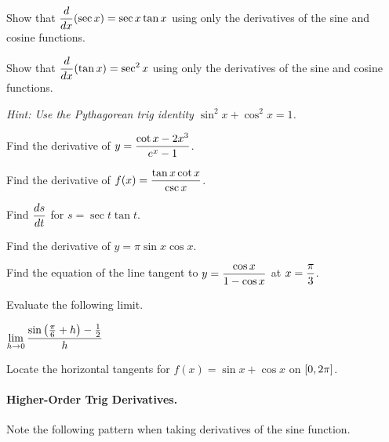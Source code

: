 \documentclass[12pt]{article}
\begin{document}
\vspace{3mm}

\Example Show that $\displaystyle\frac{d}{dx}(\sec x)=\sec x \tan x$ using only the derivatives of the sine and cosine functions.

\vspace{50mm}

\Example Show that $\displaystyle\frac{d}{dx}(\tan x)=\sec^2 x$ using only the derivatives of the sine and cosine functions.

\vspace{2mm}

\textit{Hint: Use the Pythagorean trig identity $\sin^2 x+\cos^2 x=1$.}

\newpage

\Example Find the derivative of $y=\displaystyle\frac{\cot x-2x^3}{e^x-1}$.

\vspace{30mm}

\Example Find the derivative of $f(x)=\displaystyle\frac{\tan x \cot x}{\csc x}$.

\vspace{30mm}

\Example Find $\displaystyle\frac{ds}{dt}$ for $s=\sec t \tan t$.

\vspace{50mm}

\Example Find the derivative of $y=\pi \sin x \cos x$. 

\newpage

\Example Find the equation of the line tangent to $y=\displaystyle\frac{\cos x}{1-\cos x}$ at $x=\displaystyle\frac{\pi}{3}$.

\vspace{60mm}

\Example Evaluate the following limit.

\vspace{5mm}

\hspace{10mm} $\displaystyle\lim_{h\to 0}\frac{\sin\left(\frac{\pi}{6}+h\right)-\frac{1}{2}}{h}$

\vspace{60mm}

\Example Locate the horizontal tangents for $f(x)=\sin x+\cos x$ on $\left[ 0, 2\pi\right]$.

\newpage

\paragraph{Higher-Order Trig Derivatives.} Note the following pattern when taking derivatives of the sine function.
\end{document}
